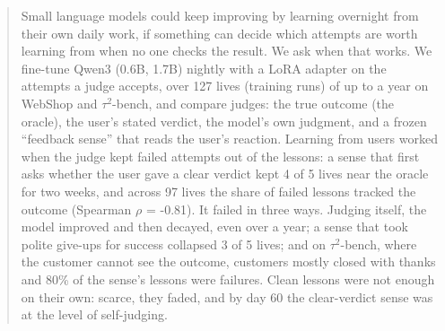 \begin{abstract}
Small language models could keep improving by learning overnight from their own daily work, if something can decide which attempts are worth learning from when no one checks the result. We ask when that works. We fine-tune Qwen3 (0.6B, 1.7B) nightly with a LoRA adapter on the attempts a judge accepts, over 127 lives (training runs) of up to a year on WebShop and $\tau^2$-bench, and compare judges: the true outcome (the oracle), the user's stated verdict, the model's own judgment, and a frozen ``feedback sense'' that reads the user's reaction. Learning from users worked when the judge kept failed attempts out of the lessons: a sense that first asks whether the user gave a clear verdict kept 4 of 5 lives near the oracle for two weeks, and across 97 lives the share of failed lessons tracked the outcome (Spearman $\rho$ = -0.81). It failed in three ways. Judging itself, the model improved and then decayed, even over a year; a sense that took polite give-ups for success collapsed 3 of 5 lives; and on $\tau^2$-bench, where the customer cannot see the outcome, customers mostly closed with thanks and 80\% of the sense's lessons were failures. Clean lessons were not enough on their own: scarce, they faded, and by day 60 the clear-verdict sense was at the level of self-judging.
\end{abstract}
